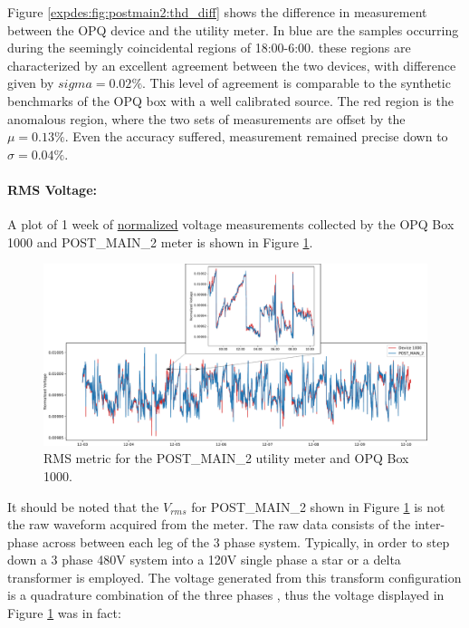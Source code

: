 Figure \ref{expdes:fig:postmain2:thd_diff} shows the difference in measurement between the OPQ device and the utility meter.
In blue are the samples occurring during the seemingly coincidental regions of 18:00-6:00.
these regions are characterized by an excellent agreement between the two devices, with difference given by $sigma =0.02\%$.
This level of agreement is comparable to the synthetic benchmarks of the OPQ box with a well calibrated source.
The red region is the anomalous region, where the two sets of measurements are offset by the $\mu = 0.13\%$.
Even the accuracy suffered, measurement remained precise down to $\sigma=0.04\%$.

\paragraph{RMS Voltage:}
A plot of 1 week of \underline{normalized} voltage measurements collected by the OPQ Box 1000 and POST\_MAIN\_2 meter is shown in Figure \ref{expdes:fig:postmain2:rms}.

\begin{figure}[ht!]
    \centering
    \includegraphics[width=1\linewidth]{img/napali_eval/gt/gt_rms.pdf}
    \caption{RMS metric for the POST\_MAIN\_2 utility meter and OPQ Box 1000.}
    \label{expdes:fig:postmain2:rms}
\end{figure}

It should be noted that the $V_{rms}$ for POST\_MAIN\_2 shown in Figure \ref{expdes:fig:postmain2:rms} is not the raw waveform acquired from the meter.
The raw data consists of the inter-phase across between each leg of the 3 phase system.
Typically, in order to step down a 3 phase 480V system into a 120V single phase a star or a delta transformer is employed.
The voltage generated from this transform configuration is a quadrature combination of the three phases \cite{Horowitz:2015:AE:2960712}, thus the voltage displayed in Figure \ref{expdes:fig:postmain2:rms} was in fact:

